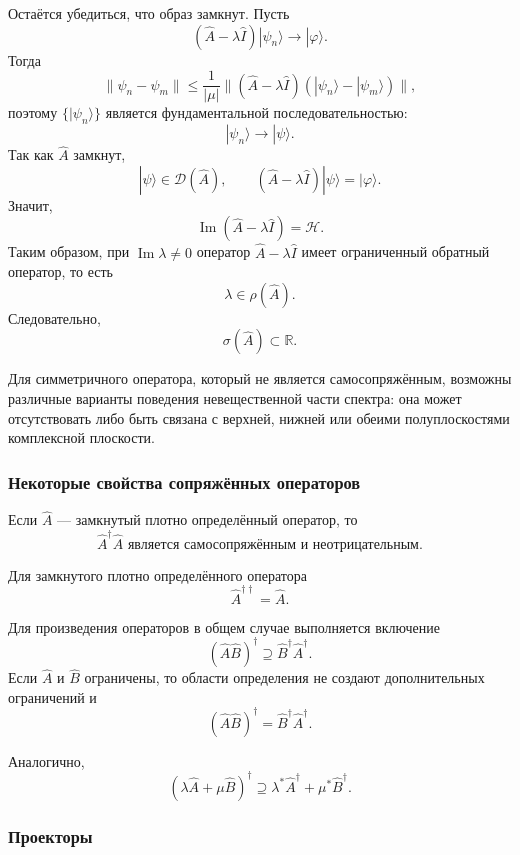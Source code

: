 \documentclass[12pt,a4paper]{article}
\begin{document}
Остаётся убедиться, что образ замкнут. Пусть
\[
    (\hat A-\lambda\hat I)|\psi_n\rangle
    \longrightarrow
    |\varphi\rangle.
\]
Тогда
\[
    \|\psi_n-\psi_m\|
    \leq
    \frac{1}{|\mu|}
    \|
        (\hat A-\lambda\hat I)
        (|\psi_n\rangle-|\psi_m\rangle)
    \|,
\]
поэтому $\{|\psi_n\rangle\}$ является фундаментальной
последовательностью:
\[
    |\psi_n\rangle\longrightarrow|\psi\rangle.
\]
Так как $\hat A$ замкнут,
\[
    |\psi\rangle\in\mathcal D(\hat A),
    \qquad
    (\hat A-\lambda\hat I)|\psi\rangle
    =
    |\varphi\rangle.
\]
Значит,
\[
    \operatorname{Im}(\hat A-\lambda\hat I)=\mathcal H.
\]
Таким образом, при $\operatorname{Im}\lambda\neq0$ оператор
$\hat A-\lambda\hat I$ имеет ограниченный обратный оператор, то есть
\[
    \lambda\in\rho(\hat A).
\]
Следовательно,
\[
    \sigma(\hat A)\subset\mathbb R.
\]

Для симметричного оператора, который не является самосопряжённым,
возможны различные варианты поведения невещественной части спектра:
она может отсутствовать либо быть связана с верхней, нижней или обеими
полуплоскостями комплексной плоскости.


\subsubsection{Некоторые свойства сопряжённых операторов}

Если $\hat A$ --- замкнутый плотно определённый оператор, то
\[
    \boxed{
        \hat A^\dagger\hat A
        \text{ является самосопряжённым и неотрицательным}
    }.
\]

Для замкнутого плотно определённого оператора
\[
    \boxed{
        \hat A^{\dagger\dagger}=\hat A
    }.
\]

Для произведения операторов в общем случае выполняется включение
\[
    \boxed{
        (\hat A\hat B)^\dagger
        \supseteq
        \hat B^\dagger\hat A^\dagger
    }.
\]
Если $\hat A$ и $\hat B$ ограничены, то области определения не создают
дополнительных ограничений и
\[
    \boxed{
        (\hat A\hat B)^\dagger
        =
        \hat B^\dagger\hat A^\dagger
    }.
\]

Аналогично,
\[
    \boxed{
    (\lambda\hat A+\mu\hat B)^\dagger
    \supseteq
    \lambda^*\hat A^\dagger
    +
    \mu^*\hat B^\dagger
    }.
\]


\subsubsection{Проекторы}
\end{document}
